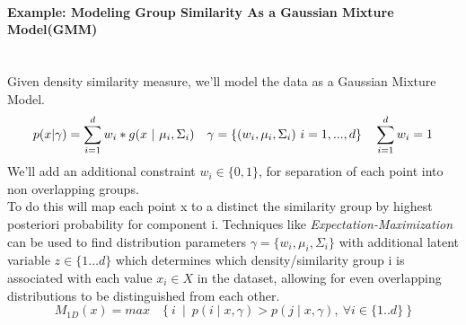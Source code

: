 \documentclass[a4paper]{article}
\begin{document}
\fi
\paragraph{Example: Modeling Group Similarity As a Gaussian Mixture Model(GMM)}\hspace{0pt} \\
Given density similarity measure, we'll model the data as  a Gaussian Mixture Model.
\begin{equation}
 p(x|\gamma) =\sum\limits_{i=1}^{d} w_i * g(x\ |\ \mu_{i}  , \Sigma_{i})\quad
 \gamma = \{(w_i, \mu_i, \Sigma_i)\  i = 1, . . . , d\}\quad  \sum\limits_{i=1}^{d} w_i=1\\
\end{equation}
We'll  add an additional constraint $w_i\in \{0,1\}$, for separation of each point into non overlapping groups.\\
To do this will map each point x to  a distinct the similarity group  by highest posteriori probability for component i.
Techniques like \emph{Expectation-Maximization} can be used to find  distribution parameters $\gamma = \{w_i, \mu_i, \Sigma_i\}$ with additional latent variable $z\in \lbrace 1\dots d \rbrace$ which determines which density/similarity group i is associated with each value $x_i\in X$ in the dataset,
allowing for even overlapping distributions to be distinguished from each other.\\
\begin{equation}
 M_{1D}(x) = max\quad \{\  i \ \mid\ p(i\mid x,\gamma) > p(j\mid x,\gamma) ,\  \forall i\in \{1..d\} \ \}
\end{equation} 
\end{document}
